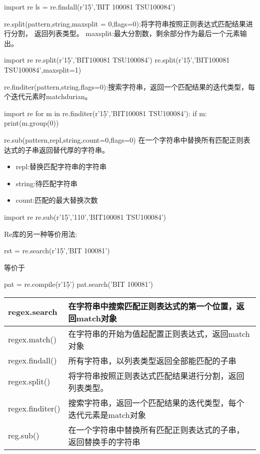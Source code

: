 \begin{python}
import re
ls = re.findall(r'1\d{5}','BIT 100081 TSU100084')
\end{python}
re.split(pattern,string,maxsplit = 0,flags=0):将字符串按照正则表达式匹配结果进行分割，
返回列表类型。\newline
maxsplit:最大分割数，剩余部分作为最后一个元素输出。\newline
\begin{python}
import re
re.split(r'1\d{5}','BIT100081 TSU100084')
re.split(r'1\d{5}','BIT100081 TSU100084',maxsplit=1)
\end{python}
re.finditer(pattern,string,flags=0):搜索字符串，返回一个匹配结果的迭代类型，每个迭代元素时matchdurian。
\begin{python}
import re
for m in re.finditer(r'1\d{5}','BIT100081 TSU100084'):
    if m:
        print(m.group(0))
\end{python}
re.sub(pattern,repl,string,count=0,flags=0)
在一个字符串中替换所有匹配正则表达式的子串返回替代厚的字符串。
\begin{itemize}
\item repl:替换匹配字符串的字符串
\item string:待匹配字符串
\item count:匹配的最大替换次数
\end{itemize}
\begin{python}
import re
re.sub(r'1\d{5}','110','BIT100081 TSU100084')
\end{python}
Re库的另一种等价用法:
\begin{python}
rst = re.search(r'1\d{5}','BIT 100081')
\end{python}
等价于
\begin{python}
pat = re.compile(r'1\d{5}')
pat.search('BIT 100081')
\end{python}
\begin{center}
\begin{tabular}{|l|l|}
\hline
regex.search&在字符串中搜索匹配正则表达式的第一个位置，返回match对象\\
\hline
regex.match()&在字符串的开始为值起配置正则表达式，返回match对象\\
\hline
regex.findall()&所有字符串，以列表类型返回全部能匹配的子串\\
\hline
regex.split()&将字符串按照正则表达式匹配结果进行分割，返回列表类型。\\
\hline
regex.finditer()&搜索字符串，返回一个匹配结果的迭代类型，每个迭代元素是match对象\\
\hline
reg.sub()&在一个字符串中替换所有匹配正则表达式的子串，返回替换手的字符串\\
\hline
\end{tabular}
\end{center}
